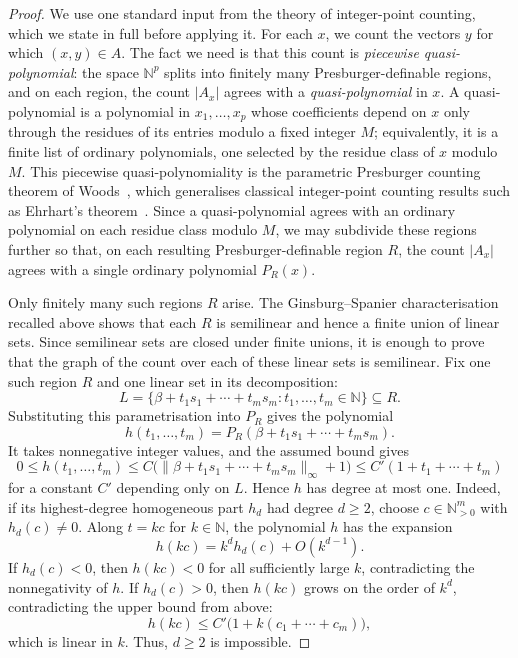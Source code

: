 \documentclass[11pt]{article}
\theoremstyle{definition}
\newcommand{\N}{\mathbb N}
\begin{document}
\begin{proof}
We use one standard input from the theory of integer-point counting, which we
state in full before applying it.  For each $x$, we count the vectors $y$ for
which $(x,y)\in A$.  The fact we need is that this count is \emph{piecewise
quasi-polynomial}: the space $\N^p$ splits into finitely many
Presburger-definable regions, and on each
region, the count $|A_x|$ agrees with a \emph{quasi-polynomial} in $x$.  A
quasi-polynomial is a polynomial in $x_1,\ldots,x_p$ whose coefficients depend on
$x$ only through the residues of its entries modulo a fixed integer $M$;
equivalently, it is a finite list of ordinary polynomials, one selected by the
residue class of $x$ modulo $M$.  This piecewise quasi-polynomiality is the
parametric Presburger counting theorem of Woods~\cite{Woods2015}, which
generalises classical integer-point counting results such as Ehrhart's
theorem~\cite{Ehrhart1962}.
Since a quasi-polynomial agrees with an ordinary polynomial on each residue
class modulo $M$, we may subdivide these regions further so that, on each
resulting Presburger-definable region $R$, the count $|A_x|$ agrees with a
single ordinary polynomial $P_R(x)$.

Only finitely many such regions $R$ arise.  The Ginsburg--Spanier
characterisation recalled above shows that each $R$ is semilinear and hence a
finite union of linear sets.  Since semilinear sets are closed under finite
unions, it is enough to prove that the graph of the count over each of these
linear sets is semilinear.  Fix one such region $R$ and one linear set in its
decomposition:
\[
   L=\{\beta+t_1s_1+\cdots+t_ms_m:t_1,\ldots,t_m\in\N\}\subseteq R.
\]
Substituting this parametrisation into $P_R$ gives the polynomial
\[
   h(t_1,\ldots,t_m)
   =P_R(\beta+t_1s_1+\cdots+t_ms_m).
\]
It takes nonnegative integer values, and the assumed bound gives
\[
   0\le h(t_1,\ldots,t_m)
   \le C\bigl(\|\beta+t_1s_1+\cdots+t_ms_m\|_\infty+1\bigr)
   \le C'(1+t_1+\cdots+t_m)
\]
for a constant $C'$ depending only on $L$.  Hence $h$ has degree at most one.
Indeed, if its highest-degree homogeneous part $h_d$ had degree $d\ge2$, choose
$c\in\N_{>0}^m$ with $h_d(c)\ne0$.  Along $t=kc$ for $k\in\N$, the polynomial $h$ has the expansion
\[
   h(kc)=k^d h_d(c)+O(k^{d-1}).
\]
If $h_d(c)<0$, then $h(kc)<0$ for all sufficiently large $k$, contradicting
the nonnegativity of $h$.  If $h_d(c)>0$, then $h(kc)$ grows on the order of
$k^d$, contradicting the upper bound from above:
\[
   h(kc)\le C'\bigl(1+k(c_1+\cdots+c_m)\bigr),
\]
which is linear in $k$.  Thus, $d\ge2$ is impossible.


\end{proof}
\end{document}
